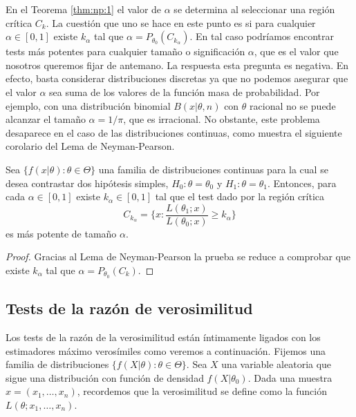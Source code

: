         En el Teorema \ref{thm:np:1} el valor de $\alpha$ se determina al seleccionar una región crítica $C_k$. La cuestión que uno se hace en este punto es si para cualquier $\alpha \in [0,1]$ existe $k_\alpha$ tal que  $\alpha = P_{\theta_0}(C_{k_\alpha})$. En tal caso podríamos encontrar tests más potentes para cualquier tamaño o significación $\alpha$, que es el valor que nosotros queremos fijar de antemano. La respuesta  esta pregunta es negativa. En efecto, basta considerar distribuciones discretas ya que no podemos asegurar que el valor $\alpha$ sea suma de los valores de la función masa de probabilidad. Por ejemplo, con una distribución binomial $B(x|\theta,n)$ con $\theta$ racional no se puede alcanzar el tamaño $\alpha = 1 / \pi$, que es irracional. No obstante, este problema desaparece en el caso de las distribuciones continuas, como muestra el siguiente corolario del Lema de Neyman-Pearson.

        \begin{cor}
            Sea $\{f(x|\theta): \theta \in \Theta\}$ una familia de distribuciones continuas para la cual se desea contrastar dos hipótesis simples, $H_0 : \theta = \theta_0$ y $H_1 : \theta = \theta_1$. Entonces, para cada $\alpha \in [0,1]$ existe $k_\alpha \in [0,1]$ tal que el test dado por la región crítica
            \[C_{k_\alpha} = \{x: \frac{L(\theta_1;x)}{L(\theta_0;x)} \ge k_\alpha\}\]
            es más potente de tamaño $\alpha$.
        \end{cor}
        \begin{proof}
            Gracias al Lema de Neyman-Pearson la prueba se reduce a comprobar que existe $k_\alpha$ tal que $\alpha = P_{\theta_0}(C_k)$.
        \end{proof}


    \subsection{Tests de la razón de verosimilitud}

        Los tests de la razón de la verosimilitud están íntimamente ligados con los estimadores máximo verosímiles como veremos a continuación. Fijemos una familia de distribuciones $\{f(X|\theta): \theta \in \Theta\}$. Sea $X$ una variable aleatoria que sigue una distribución con función de densidad $f(X | \theta_0)$. Dada una muestra $x = (x_1, \ldots, x_n)$, recordemos que la verosimilitud se define como la función
        $L(\theta;x_1, \ldots, x_n)$.

